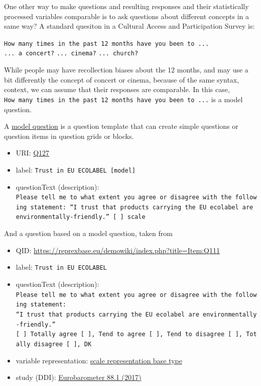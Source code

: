 \documentclass[
  letterpaper,
  DIV=11,
  numbers=noendperiod]{scrreprt}
\providecommand{\tightlist}{%
  \setlength{\itemsep}{0pt}\setlength{\parskip}{0pt}}\usepackage{longtable,booktabs,array}
\begin{document}
One other way to make questions and resulting responses and their
statistically processed variables comparable is to ask questions about
different concepts in a same way? A standard quesiton in a Cultural
Access and Participation Survey is:

\texttt{How\ many\ times\ in\ the\ past\ 12\ months\ have\ you\ been\ to\ ...}
\texttt{...\ a\ concert?} \texttt{...\ cinema?} \texttt{...\ church?}

While people may have recollection biases about the 12 months, and may
use a bit differently the concept of concert or cinema, because of the
same syntax, context, we can assume that their responses are comparable.
In this case,
\texttt{How\ many\ times\ in\ the\ past\ 12\ months\ have\ you\ been\ to\ ...}
is a model question.

A \href{https://reprexbase.eu/demowiki/index.php?title=Item:Q126}{model
question} is a question template that can create simple questions or
question items in question grids or blocks.

\begin{itemize}
\tightlist
\item
  URI:
  \href{https://reprexbase.eu/demowiki/index.php?title=Item:Q127}{Q127}
\item
  label: \texttt{Trust\ in\ EU\ ECOLABEL\ {[}model{]}}
\item
  questionText (description):
  \texttt{Please\ tell\ me\ to\ what\ extent\ you\ agree\ or\ disagree\ with\ the\ following\ statement:\ “I\ trust\ that\ products\ carrying\ the\ EU\ ecolabel\ are\ environmentally-friendly.”\ {[}\ {]}\ scale}
\end{itemize}

And a question based on a model question, taken from

\begin{itemize}
\item
  QID: \url{https://reprexbase.eu/demowiki/index.php?title=Item:Q111}
\item
  label: \texttt{Trust\ in\ EU\ ECOLABEL}
\item
  questionText (description):
  \texttt{Please\ tell\ me\ to\ what\ extent\ you\ agree\ or\ disagree\ with\ the\ following\ statement:}
  \texttt{“I\ trust\ that\ products\ carrying\ the\ EU\ ecolabel\ are\ environmentally-friendly.”}
  \texttt{{[}\ {]}\ Totally\ agree\ {[}\ {]},\ Tend\ to\ agree\ {[}\ {]},\ Tend\ to\ disagree\ {[}\ {]},\ Totally\ disagree\ {[}\ {]},\ DK}
\item
  variable representation:
  \href{https://reprexbase.eu/demowiki/index.php?title=Item:Q116}{scale
  representation base type}
\item
  study (DDI):
  \href{https://reprexbase.eu/demowiki/index.php?title=Item:Q139}{Eurobarometer
  88.1 (2017)}
\end{itemize}
\end{document}
